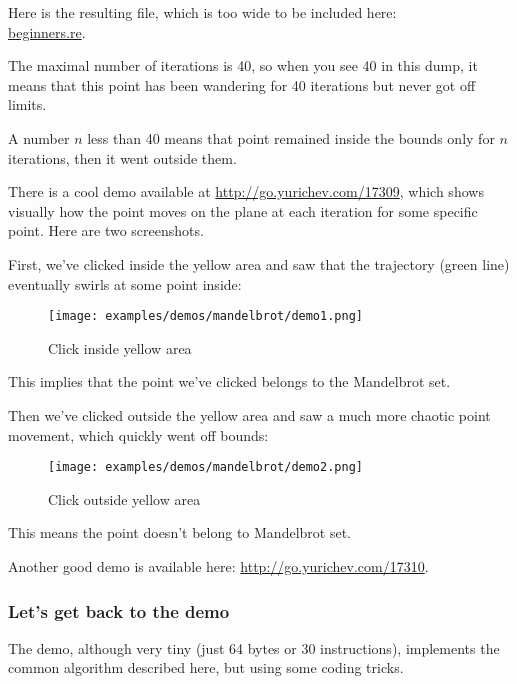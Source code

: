 

Here is the resulting file, 
which is too wide to be included here: \\
\href{http://go.yurichev.com/17164}{beginners.re}.

The maximal number of iterations is 40, so when you see 40 in this dump, it means that this point has been wandering
for 40 iterations but never got off limits. 

A number $n$ less than 40 means that point remained inside the bounds only for $n$ iterations, 
then it went outside them.

\clearpage
There is a cool demo available at 
\url{http://go.yurichev.com/17309}, which shows
visually how the point moves on the plane at each iteration for some specific point. 
Here are two screenshots.

%
First, we've clicked inside the yellow area and saw that the trajectory (green line)
eventually swirls at some point inside:

\begin{figure}[H]
\centering
\texttt{[image: examples/demos/mandelbrot/demo1.png]}
\caption{Click inside yellow area}
\end{figure}


This implies that the point we've clicked belongs to the Mandelbrot set.

\clearpage

Then we've clicked outside the yellow area and saw a much more chaotic point movement, 
which quickly went off bounds:

\begin{figure}[H]
\centering
\texttt{[image: examples/demos/mandelbrot/demo2.png]}
\caption{Click outside yellow area}
\end{figure}

This means the point doesn't belong to Mandelbrot set.

Another good demo is available here: 
\url{http://go.yurichev.com/17310}.

\clearpage
\subsubsection{Let's get back to the demo}


The demo, although very tiny (just 64 bytes or 30 instructions), implements the common algorithm 
described here, but using some coding tricks.

